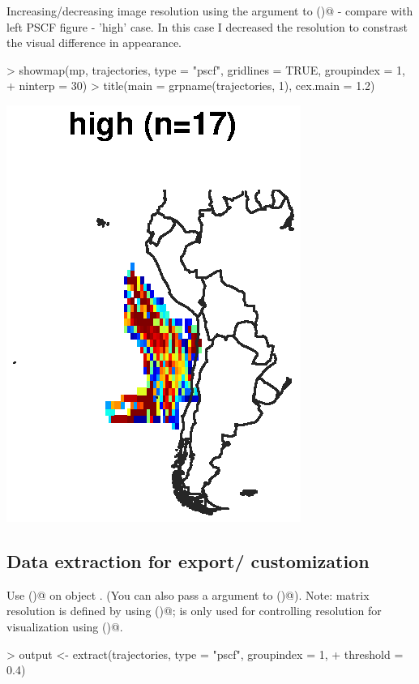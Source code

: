 \documentclass{article}
\renewenvironment{Schunk}{\vspace{\topsep}}{\vspace{\topsep}}
\begin{document}
Increasing/decreasing image resolution using the \verb@ninterp@
argument to \verb@showmap()@ - compare with left PSCF figure - 'high'
case. In this case I decreased the resolution to constrast the visual
difference in appearance.
\begin{Schunk}
\begin{Sinput}
> showmap(mp, trajectories, type = "pscf", gridlines = TRUE, groupindex = 1, 
+     ninterp = 30)
> title(main = grpname(trajectories, 1), cex.main = 1.2)
\end{Sinput}
\end{Schunk}
\includegraphics{figures/fig-023}

\subsection{Data extraction for export/ customization}

Use \verb@extract()@ on object \verb@trajectories@. (You can also pass
a \verb@threshold@ argument to \verb@extract()@). Note: matrix
resolution is defined by \verb@xygrid@ using \verb@definegrid()@;
\verb@ninterp@ is only used for controlling resolution for
visualization using \verb@showmap()@.
\begin{Schunk}
\begin{Sinput}
> output <- extract(trajectories, type = "pscf", groupindex = 1, 
+     threshold = 0.4)
\end{Sinput}
\end{Schunk}
\end{document}
